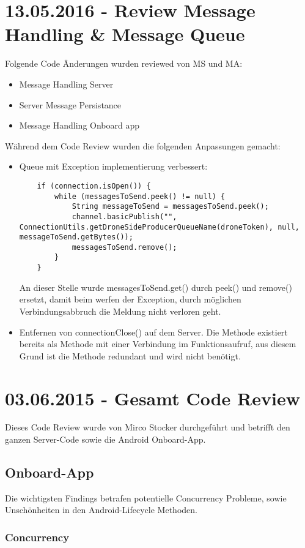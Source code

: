 \section{13.05.2016 - Review Message Handling \& Message Queue}
Folgende Code Änderungen wurden reviewed von MS und MA:
\begin{itemize}
	\item{Message Handling Server}
	\item{Server Message Persistance}
	\item{Message Handling Onboard app}
\end{itemize}
Während dem Code Review wurden die folgenden Anpassungen gemacht:
\begin{itemize}
	\item{Queue mit Exception implementierung verbessert:
	\begin{lstlisting}
    if (connection.isOpen()) {
        while (messagesToSend.peek() != null) {
            String messageToSend = messagesToSend.peek();
            channel.basicPublish("", ConnectionUtils.getDroneSideProducerQueueName(droneToken), null, messageToSend.getBytes());
            messagesToSend.remove();
        }
    }
	\end{lstlisting}
	An dieser Stelle wurde messagesToSend.get() durch peek() und remove() ersetzt, damit beim werfen der Exception, durch möglichen Verbindungsabbruch die Meldung nicht verloren geht.}
	\item{Entfernen von connectionClose() auf dem Server. Die Methode existiert bereits als Methode mit einer Verbindung im Funktionsaufruf, aus diesem Grund ist die Methode redundant und wird nicht benötigt.}
\end{itemize}
\section{03.06.2015 - Gesamt Code Review}

Dieses Code Review wurde von Mirco Stocker durchgeführt und betrifft den ganzen Server-Code sowie die Android Onboard-App.

\subsection{Onboard-App}

Die wichtigsten Findings betrafen potentielle Concurrency Probleme, sowie Unschönheiten in den Android-Lifecycle Methoden.

\subsubsection{Concurrency}

